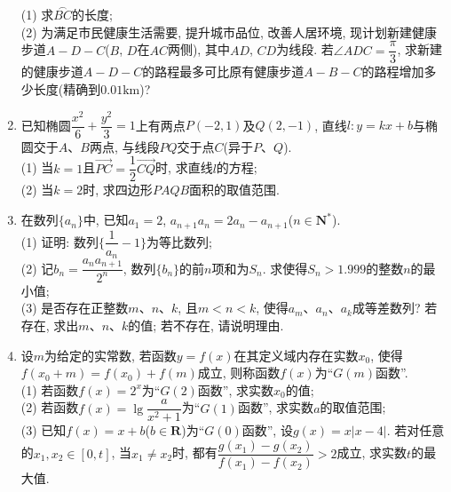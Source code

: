\documentclass[10pt,a4paper]{article}
\begin{document}
\begin{enumerate}[1.]
\begin{center}
\end{center}
(1) 求$\overset\frown{BC}$的长度;\\
(2) 为满足市民健康生活需要, 提升城市品位, 改善人居环境, 现计划新建健康步道$A-D-C$($B$, $D$在$AC$两侧), 其中$AD$, $CD$为线段. 若$\angle ADC=\dfrac{\pi}3$, 求新建的健康步道$A-D-C$的路程最多可比原有健康步道$A-B-C$的路程增加多少长度(精确到$0.01\text{km}$)?
\item 已知椭圆$\dfrac{x^2}{6}+\dfrac{y^2}{3}=1$上有两点$P(-2,1)$及$Q(2,-1)$, 直线$l:y=kx+b$与椭圆交于$A$、$B$两点, 与线段$PQ$交于点$C$(异于$P$、$Q$).\\
(1) 当$k=1$且$\overrightarrow{PC}=\dfrac 12\overrightarrow{CQ}$时, 求直线$l$的方程;\\
(2) 当$k=2$时, 求四边形$PAQB$面积的取值范围.
\item 在数列$\{a_n\}$中, 已知$a_1=2$, $a_{n+1}a_n=2a_n-a_{n+1}$($n\in \mathbf{N}^*$).\\
(1) 证明: 数列$\{\dfrac 1{a_n}-1\}$为等比数列;\\
(2) 记$b_n=\dfrac{a_na_{n+1}}{2^n}$, 数列$\{b_n\}$的前$n$项和为$S_n$. 求使得$S_n>1.999$的整数$n$的最小值;\\
(3) 是否存在正整数$m$、$n$、$k$, 且$m<n<k$, 使得$a_m$、$a_n$、$a_k$成等差数列? 若存在, 求出$m$、$n$、$k$的值; 若不存在, 请说明理由.
\item 设$m$为给定的实常数, 若函数$y=f(x)$在其定义域内存在实数$x_0$, 使得$f(x_0+m)=f(x_0)+f(m)$成立, 则称函数$f(x)$为``$G(m)$函数''.\\
(1) 若函数$f(x)=2^x$为``$G(2)$函数'', 求实数$x_0$的值;\\
(2) 若函数$f(x)=\lg \dfrac a{x^2+1}$为``$G(1)$函数'', 求实数$a$的取值范围;\\
(3) 已知$f(x)=x+b$($b\in \mathbf{R}$)为``$G(0)$函数'', 设$g(x)=x|x-4|$. 若对任意的$x_1,x_2\in[0,t]$, 当$x_1\ne x_2$时, 都有$\dfrac{g(x_1)-g(x_2)}{f(x_1)-f(x_2)}>2$成立, 求实数$t$的最大值.







\end{enumerate}
\end{document}
